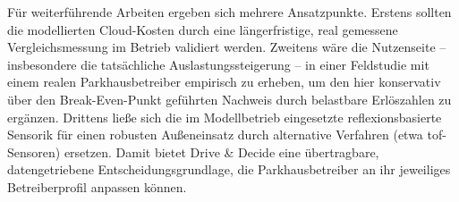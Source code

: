 Für weiterführende Arbeiten ergeben sich mehrere Ansatzpunkte. Erstens sollten die modellierten Cloud-Kosten durch eine längerfristige, real gemessene Vergleichsmessung im Betrieb validiert werden. Zweitens wäre die Nutzenseite -- insbesondere die tatsächliche Auslastungssteigerung -- in einer Feldstudie mit einem realen Parkhausbetreiber empirisch zu erheben, um den hier konservativ über den Break-Even-Punkt geführten Nachweis durch belastbare Erlöszahlen zu ergänzen. Drittens ließe sich die im Modellbetrieb eingesetzte reflexionsbasierte Sensorik für einen robusten Außeneinsatz durch alternative Verfahren (etwa \ac{tof}-Sensoren) ersetzen. Damit bietet Drive \& Decide eine übertragbare, datengetriebene Entscheidungsgrundlage, die Parkhausbetreiber an ihr jeweiliges Betreiberprofil anpassen können.
